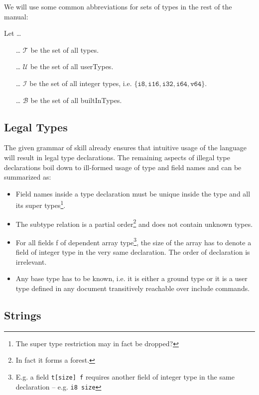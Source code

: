 We will use some common abbreviations for sets of types in the rest of the manual:

Let \ldots
\begin{itemize}
 \item[\ldots] $\mathcal{T}$ be the set of all types.
 \item[\ldots] $\mathcal{U}$ be the set of all \glspl{userType}.
 \item[\ldots] $\mathcal{I}$ be the set of all integer types, i.e. $\{\texttt{i8},\texttt{i16},\texttt{i32},\texttt{i64},\texttt{v64}\}$.
 \item[\ldots] $\mathcal{B}$ be the set of all \glspl{builtInType}.
\end{itemize}


\subsection{Legal Types}

The given grammar of \gls{skill} already ensures that intuitive usage of the language will result in legal type declarations. The remaining aspects of illegal type declarations boil down to ill-formed usage of type and field names and can be summarized as:
\begin{itemize}
 \item Field names inside a type declaration must be unique inside the type and all its super types\footnote{The super type restriction may in fact be dropped?}.
 
 \item The subtype relation is a partial order\footnote{In fact it forms a forest.} and does not contain unknown types.

 \item For all fields f of dependent array type\footnote{E.g. a field \texttt{t[size] f} requires another field of integer type in the same declaration -- e.g. \texttt{i8 size}}, the size of the array has to denote a field of integer type in the very same declaration. The order of declaration is irrelevant.
 
 \item Any base type has to be known, i.e. it is either a ground type or it is a user type defined in any document transitively reachable over include commands.
\end{itemize}


\subsection{Strings}

